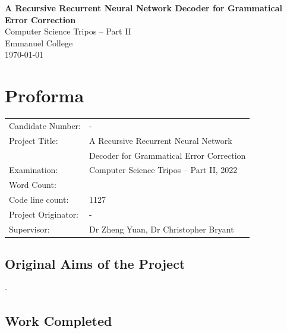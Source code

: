\documentclass[12pt,a4paper,twoside,openright]{report}
\newcommand{\quickwordcount}[1]{%
  \immediate\write18{texcount -1 -sum -merge -q #1.tex output.bbl > #1-words.sum }%
}
\begin{document}





\pagestyle{empty}


\vspace*{60mm}
\begin{center}
\Huge
\textbf{A Recursive Recurrent Neural Network Decoder for Grammatical Error Correction} \\[5mm]
Computer Science Tripos -- Part II \\[5mm]
Emmanuel College \\[5mm]
\today  %
\end{center}


\pagestyle{plain}

\chapter*{Proforma}

{\large
\begin{tabular}{ll}
Candidate Number:   & -                       \\
Project Title:      & A Recursive Recurrent Neural Network \\
 & Decoder for Grammatical Error Correction \\
Examination:        & Computer Science Tripos -- Part II, 2022  \\
Word Count:         & \quickwordcount{diss}\footnotemark[1] \\
Code line count:    & 1127 \\
Project Originator: & - \\
Supervisor:         & Dr Zheng Yuan, Dr Christopher Bryant
\end{tabular}
}


\section*{Original Aims of the Project}

-


\section*{Work Completed}
\end{document}
